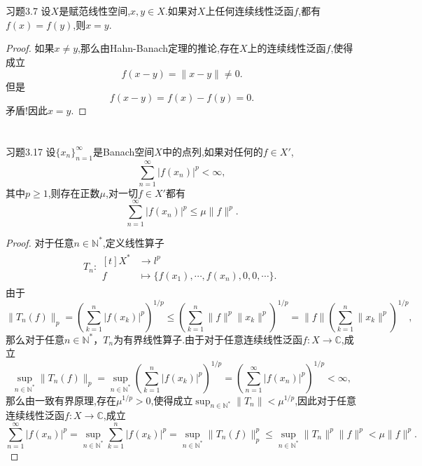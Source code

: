 \documentclass[lang = cn, scheme = chinese]{elegantbook}
\newcommand{\N}{\mathbb{N}}            %
\newcommand{\C}{\mathbb{C}}  		   %
\begin{document}
	\chapter{}
	
	\begin{proposition}{习题3.7}
		设$X$是赋范线性空间,$x,y\in X$.如果对$X$上任何连续线性泛函$f$,都有$f(x)=f(y)$,则$x=y$.
	\end{proposition}
	
	\begin{proof}
		如果$x\ne y$,那么由Hahn-Banach定理的推论,存在$X$上的连续线性泛函$f$,使得成立
		$$
		f(x-y)=\|x-y\|\ne0.
		$$
		但是
		$$
		f(x-y)=f(x)-f(y)=0.
		$$
		矛盾!因此$x=y$.
	\end{proof}
	
	\chapter{}
	
	\begin{proposition}{习题3.17}
		设$\{x_n\}_{n=1}^{\infty}$是Banach空间$X$中的点列,如果对任何的$f\in X'$,
		$$
		\sum_{n=1}^{\infty}|f(x_n)|^p<\infty,
		$$
		其中$p\ge 1$,则存在正数$\mu$,对一切$f\in X'$都有
		$$
		\sum_{n=1}^{\infty}|f(x_n)|^p\le \mu\|f\|^p.
		$$
	\end{proposition}
	
	\begin{proof}
		对于任意$n\in\mathbb{N}^*$,定义线性算子
		\begin{align*}
			T_n:\begin{aligned}[t]
				X^*&\longrightarrow l^p\\
				f&\longmapsto \{ f(x_1),\cdots,f(x_n),0,0,\cdots \}.
			\end{aligned}
		\end{align*}
		由于
		$$
		\|T_n(f)\|_p
		= \left(\sum_{k=1}^{n}|f(x_k)|^p\right)^{1/p}
		\le \left(\sum_{k=1}^{n}\|f\|^p\|x_k\|^p\right)^{1/p}
		= \|f\|\left(\sum_{k=1}^{n}\|x_k\|^p\right)^{1/p},
		$$
		那么对于任意$n\in\N^*$，$T_n$为有界线性算子.由于对于任意连续线性泛函$f:X\to\C$,成立
		$$
		\sup_{n\in\N^*}\|T_n(f)\|_p
		= \sup_{n\in\N^*}\left(\sum_{k=1}^{n}|f(x_k)|^p\right)^{1/p}
		= \left(\sum_{n=1}^{\infty}|f(x_n)|^p\right)^{1/p}
		<\infty,
		$$
		那么由一致有界原理,存在$\mu^{1/p}>0$,使得成立$\displaystyle \sup_{n\in\N^*}\|T_n\|<\mu^{1/p}$,因此对于任意连续线性泛函$f:X\to\C$,成立
		$$
		\sum_{n=1}^{\infty}|f(x_n)|^p
		= \sup_{n\in\N^*}\sum_{k=1}^{n}|f(x_k)|^p
		= \sup_{n\in\N^*}\|T_n(f)\|_p^p
		\le \sup_{n\in\N^*}\|T_n\|^p\|f\|^p
		< \mu \|f\|^p.
		$$
	\end{proof}
	
\end{document}

